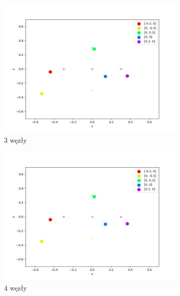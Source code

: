 \begin{figure}[h]
\centering
\begin{subfigure}{.5\textwidth}
    \centering
    \includegraphics[width=\linewidth]{pics/mult_lat_2d_num/positions_3_mean.png}
\caption{3 węzły}
\label{pic:2d_3_num_mult}
\end{subfigure}%
\begin{subfigure}{.5\textwidth}
    \centering
    \includegraphics[width=\linewidth]{pics/mult_lat_2d_num/positions_3_mean.png}
\caption{4 węzły}
\label{pic:2d_4_num_mult}
\end{subfigure}
\begin{subfigure}{.5\textwidth}
    \centering

\end{subfigure}
\end{figure}
